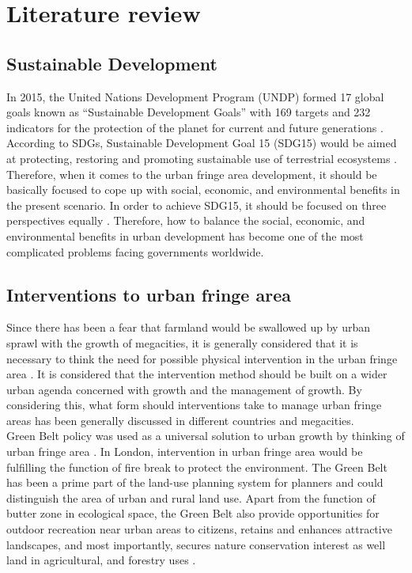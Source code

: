 \section{Literature review} 


\subsection{Sustainable Development}
In 2015, the United Nations Development Program (UNDP) formed 17 global goals known as “Sustainable Development Goals” with 169 targets and 232 indicators for the protection of the planet for current and future generations \parencite{pedersen_zari_ecosystem_2012}. According to SDGs, Sustainable Development Goal 15 (SDG15) would be aimed at protecting, restoring and promoting sustainable use of terrestrial ecosystems \parencite{un_transforming_2015}. Therefore, when it comes to the urban fringe area development, it should be basically focused to cope up with social, economic, and environmental benefits in the present scenario. In order to achieve SDG15, it should be focused on three perspectives equally \parencite{howlader_exploring_2020}. Therefore, how to balance the social, economic, and environmental benefits in urban development has become one of the most complicated problems facing governments worldwide.\\

\subsection{Interventions to urban fringe area}
Since there has been a fear that farmland would be swallowed up by urban sprawl with the growth of megacities, it is generally considered that it is necessary to think the need for possible physical intervention in the urban fringe area \parencite{gallent_representing_2007}\parencite{gallent_ruralurban_2006}. It is considered that the intervention method should be built on a wider urban agenda concerned with growth and the management of growth. By considering this, what form should interventions take to manage urban fringe areas has been generally discussed in different countries and megacities. \\

Green Belt policy was used as a universal solution to urban growth by thinking of urban fringe area \parencite{gant_land-use_2011}. In London, intervention in urban fringe area would be fulfilling the function of fire break to protect the environment. The Green Belt has been a prime part of the land-use planning system for planners and could distinguish the area of urban and rural land use. Apart from the function of butter zone in ecological space, the Green Belt also provide opportunities for outdoor recreation near urban areas to citizens, retains and enhances attractive landscapes, and most importantly, secures nature conservation interest as well land in agricultural, and forestry uses \parencite{ferguson_informal_1979}. \\

